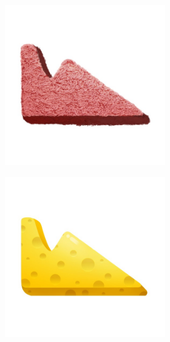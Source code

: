 \begin{figure}[h!]
    \begin{center}
        \begin{subfigure}[b]{0.3\textwidth}
            \begin{center}
                \begin{subfigure}[b]{0.4\textwidth}
                    \includegraphics[width=\linewidth]{figures/artist_objects/fake1_carpet_red.jpg}
                \end{subfigure}
                \begin{subfigure}[b]{0.4\textwidth}
                    \includegraphics[width=\linewidth]{figures/artist_objects/fake1_sponge_yellow.jpg}

\end{subfigure}
\end{center}
\end{subfigure}
\end{center}
\end{figure}
